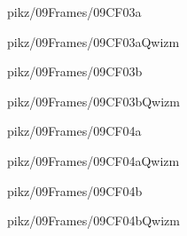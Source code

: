 \documentclass[9pt,xcolor={svgnames, x11names}]{beamer}
\begin{document}

\begin{frame}{pikz/09Frames/09CF03a}
  
\end{frame}


\begin{frame}{pikz/09Frames/09CF03aQwizm}
  
\end{frame}


\begin{frame}{pikz/09Frames/09CF03b}
  
\end{frame}


\begin{frame}{pikz/09Frames/09CF03bQwizm}
  
\end{frame}


\begin{frame}{pikz/09Frames/09CF04a}
  
\end{frame}


\begin{frame}{pikz/09Frames/09CF04aQwizm}
  
\end{frame}


\begin{frame}{pikz/09Frames/09CF04b}  
  
\end{frame}


\begin{frame}{pikz/09Frames/09CF04bQwizm}  
  
\end{frame}
\end{document}
